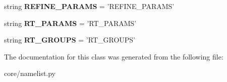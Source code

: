 \begin{DoxyCompactItemize}
\item 
\hypertarget{classseren3_1_1core_1_1namelist_1_1NML_afb19980e1586cf2c932d78c843698a71}{
string {\bfseries REFINE\_\-PARAMS} = 'REFINE\_\-PARAMS'}
\label{classseren3_1_1core_1_1namelist_1_1NML_afb19980e1586cf2c932d78c843698a71}

\item 
\hypertarget{classseren3_1_1core_1_1namelist_1_1NML_a211fabaa0e0cb8749870982bc30e532a}{
string {\bfseries RT\_\-PARAMS} = 'RT\_\-PARAMS'}
\label{classseren3_1_1core_1_1namelist_1_1NML_a211fabaa0e0cb8749870982bc30e532a}

\item 
\hypertarget{classseren3_1_1core_1_1namelist_1_1NML_af713a9526a3929be3bc2bbf4d7c7d874}{
string {\bfseries RT\_\-GROUPS} = 'RT\_\-GROUPS'}
\label{classseren3_1_1core_1_1namelist_1_1NML_af713a9526a3929be3bc2bbf4d7c7d874}

\end{DoxyCompactItemize}


The documentation for this class was generated from the following file:\begin{DoxyCompactItemize}
\item 
core/namelist.py\end{DoxyCompactItemize}
